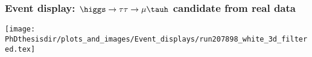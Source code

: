 %
%

\begin{frame}
\frametitle{Event display: $\higgs\to\tau\tau\to\mu\tauh$ candidate from real data}

\begin{center}
\texttt{[image: \\PhDthesisdir/plots\_and\_images/Event\_displays/run207898\_white\_3d\_filtered.tex]}
\end{center}

\end{frame}
